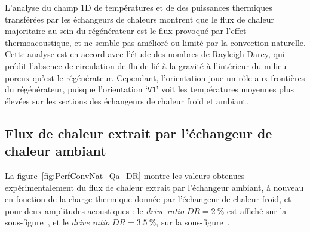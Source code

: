 %        
%        

L'analyse du champ 1D de températures et de des puissances thermiques transférées par les échangeurs de chaleurs montrent que le flux de chaleur majoritaire au sein du régénérateur est le flux provoqué par l'effet thermoacoustique, et ne semble pas amélioré ou limité par la convection naturelle. Cette analyse est en accord avec l'étude des nombres de Rayleigh-Darcy, qui prédit l'absence de circulation de fluide lié à la gravité à l'intérieur du milieu poreux qu'est le régénérateur. Cependant, l'orientation joue un rôle aux frontières du régénérateur, puisque l'orientation `\texttt{V1}' voit les températures moyennes plus élevées sur les sections des échangeurs de chaleur froid et ambiant.

\subsection{Flux de chaleur extrait par l'échangeur de chaleur ambiant}

La figure~\ref{fig:PerfConvNat_Qa_DR} montre les valeurs obtenues expérimentalement du flux de chaleur extrait par l'échangeur ambiant, à nouveau en fonction de la charge thermique donnée par l'échangeur de chaleur froid, et pour deux amplitudes acoustiques : le \textit{drive ratio} $DR=\qty{2}{\percent}$ est affiché sur la sous-figure~, et le \textit{drive ratio} $DR=\qty{3.5}{\percent}$, sur la sous-figure~.

